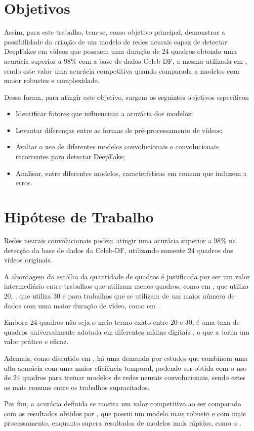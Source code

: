 \documentclass[12pt,a4paper, brazil]{article}
\begin{document}
\section{Objetivos}
    \par Assim, para este trabalho, tem-se, como objetivo principal, demonstrar a possibilidade da criação de um modelo de redes neurais capaz de detectar DeepFakes em vídeos que possuem uma duração de 24 quadros obtendo uma acurácia superior a 98\% com a base de dados Celeb-DF, a mesma utilizada em \cite{Hernandez-Ortega2022}, sendo este valor uma acurácia competitiva quando comparada a modelos com maior robustez e complexidade.

    \par Dessa forma, para atingir este objetivo, surgem os seguintes objetivos específicos:
    \begin{itemize}
        \item Identificar fatores que influenciam a acurácia dos modelos;
        \item Levantar diferenças entre as formas de pré-processamento de vídeos;
        \item Avaliar o uso de diferentes modelos convolucionais e convolucionais recorrentes para detectar DeepFake;
        \item Analisar, entre diferentes modelos, características em comum que induzem a erros.
    \end{itemize}

\section{Hipótese de Trabalho}
    \par Redes neurais convolucionais podem atingir uma acurácia superior a 98\% na detecção da base de dados da Celeb-DF, utilizando somente 24 quadros dos vídeos originais. 
    \par A abordagem da escolha da quantidade de quadros é justificada por ser um valor intermediário entre trabalhos que utilizam menos quadros, como em \cite{Hu_Liao_Liang_Zhou_Qin_2022}, que utiliza 20, \cite{Singh2020}, que utiliza 30 e para trabalhos que se utilizam de um maior número de dados com uma maior duração de vídeo, como em \cite{Hernandez-Ortega2022}. 
    \par Embora 24 quadros não seja o meio termo exato entre 20 e 30, é uma taxa de quadros universalmente adotada em diferentes mídias digitais \cite{Wilcox2015}, o que a torna um valor prático e eficaz. 
    \par Ademais, como discutido em \cite{Heidari2024}, há uma demanda por estudos que combinem uma alta acurácia com uma maior eficiência temporal, podendo ser obtida com o uso de 24 quadros para treinar modelos de redes neurais convolucionais, sendo estes os mais comuns entre os trabalhos supracitados.
    \par Por fim, a acurácia definida se mostra um valor competitivo ao ser comparada com os resultados obtidos por \cite{Hernandez-Ortega2022}, que possui um modelo mais robusto e com mais processamento, enquanto supera resultados de modelos mais rápidos, como o \cite{Singh2020}.
    
\end{document}
